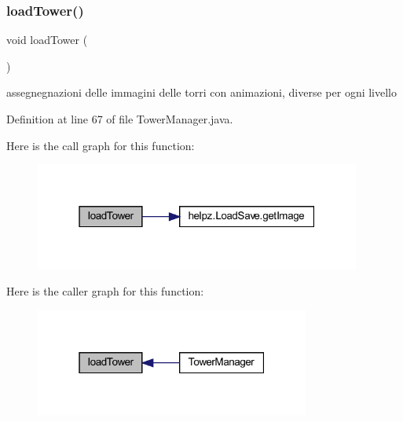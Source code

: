 \mbox{\label{classmanagers_1_1_tower_manager_afcea12e616fbcfcaf7b40fba856f22ca}} 
\subsubsection{\texorpdfstring{load\+Tower()}{loadTower()}}
{\footnotesize\ttfamily void load\+Tower (\begin{DoxyParamCaption}{ }\end{DoxyParamCaption})\hspace{0.3cm}{\ttfamily [private]}}



assegnegnazioni delle immagini delle torri con animazioni, diverse per ogni livello 



Definition at line 67 of file Tower\+Manager.\+java.

Here is the call graph for this function\+:
\nopagebreak
\begin{figure}[H]
\begin{center}
\leavevmode
\includegraphics[width=304pt]{classmanagers_1_1_tower_manager_afcea12e616fbcfcaf7b40fba856f22ca_cgraph}
\end{center}
\end{figure}
Here is the caller graph for this function\+:
\nopagebreak
\begin{figure}[H]
\begin{center}
\leavevmode
\includegraphics[width=256pt]{classmanagers_1_1_tower_manager_afcea12e616fbcfcaf7b40fba856f22ca_icgraph}
\end{center}
\end{figure}
\mbox{\label{classmanagers_1_1_tower_manager_addba85b44e35a186e066b2e801f433c4}} 
